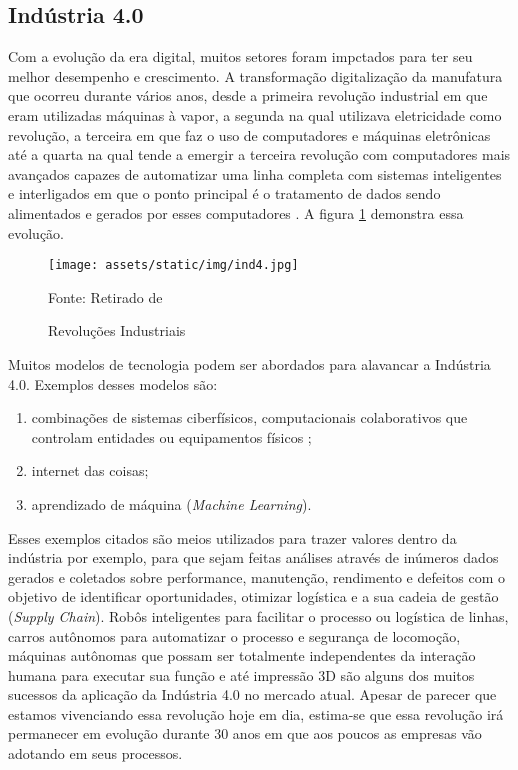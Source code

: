 \documentclass[../../layout.tex]{subfiles}
\begin{document}
\subsection{Indústria 4.0}
\hspace*{3em}Com a evolução da era digital, muitos setores foram impctados para ter seu melhor desempenho e crescimento. A transformação digitalização da manufatura que ocorreu durante vários anos, desde a primeira revolução industrial em que eram utilizadas máquinas à vapor, a segunda na qual utilizava eletricidade como revolução, a terceira em que faz o uso de computadores e máquinas eletrônicas até a quarta na qual tende a emergir a terceira revolução com computadores mais avançados capazes de automatizar uma linha completa com sistemas inteligentes e interligados em que o ponto principal é o tratamento de dados sendo alimentados e gerados por esses computadores .
\hspace*{3em}A figura \ref{fig:ind} demonstra essa evolução.

\begin{figure}[H]
\centering
\caption{Revoluções Industriais}
\texttt{[image: assets/static/img/ind4.jpg]}
\label{fig:ind}

\begin{minipage}{0.7\textwidth}
\raggedright \footnotesize Fonte: Retirado de  
\end{minipage}
\end{figure}


\hspace*{3em}Muitos modelos de tecnologia podem ser abordados para alavancar a Indústria 4.0. Exemplos desses modelos são:
\begin{enumerate}[label=\alph*)]
\itemsep0em
    \item combinações de sistemas ciberfísicos, computacionais colaborativos que controlam entidades ou equipamentos físicos ;
    \item internet das coisas;
    \item aprendizado de máquina (\emph{Machine Learning}).
\end{enumerate}

\hspace*{3em}Esses exemplos citados são meios utilizados para trazer valores dentro da indústria por exemplo, para que sejam feitas análises através de inúmeros dados gerados e coletados sobre performance, manutenção, rendimento e defeitos com o objetivo de identificar oportunidades, otimizar logística e a sua cadeia de gestão (\emph{Supply Chain}). Robôs inteligentes para facilitar o processo ou logística de linhas, carros autônomos para automatizar o processo e segurança de locomoção, máquinas autônomas que possam ser totalmente independentes da interação humana para executar sua função e até impressão 3D são alguns dos muitos sucessos da aplicação da Indústria 4.0 no mercado atual. Apesar de parecer que estamos vivenciando essa revolução hoje em dia, estima-se que essa revolução irá permanecer em evolução durante 30 anos em que aos poucos as empresas vão adotando em seus processos.
\end{document}
